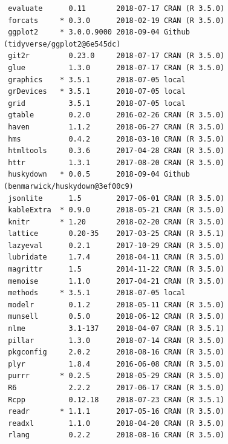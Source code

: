\documentclass[twoside,12pt,final]{ucthesis-CA2012}
\begin{document}
\begin{ucmainmatter}
\begin{verbatim}
 evaluate      0.11       2018-07-17 CRAN (R 3.5.0)                       
 forcats     * 0.3.0      2018-02-19 CRAN (R 3.5.0)                       
 ggplot2     * 3.0.0.9000 2018-09-04 Github (tidyverse/ggplot2@6e545dc)   
 git2r         0.23.0     2018-07-17 CRAN (R 3.5.0)                       
 glue          1.3.0      2018-07-17 CRAN (R 3.5.0)                       
 graphics    * 3.5.1      2018-07-05 local                                
 grDevices   * 3.5.1      2018-07-05 local                                
 grid          3.5.1      2018-07-05 local                                
 gtable        0.2.0      2016-02-26 CRAN (R 3.5.0)                       
 haven         1.1.2      2018-06-27 CRAN (R 3.5.0)                       
 hms           0.4.2      2018-03-10 CRAN (R 3.5.0)                       
 htmltools     0.3.6      2017-04-28 CRAN (R 3.5.0)                       
 httr          1.3.1      2017-08-20 CRAN (R 3.5.0)                       
 huskydown   * 0.0.5      2018-09-04 Github (benmarwick/huskydown@3ef00c9)
 jsonlite      1.5        2017-06-01 CRAN (R 3.5.0)                       
 kableExtra  * 0.9.0      2018-05-21 CRAN (R 3.5.0)                       
 knitr       * 1.20       2018-02-20 CRAN (R 3.5.0)                       
 lattice       0.20-35    2017-03-25 CRAN (R 3.5.1)                       
 lazyeval      0.2.1      2017-10-29 CRAN (R 3.5.0)                       
 lubridate     1.7.4      2018-04-11 CRAN (R 3.5.0)                       
 magrittr      1.5        2014-11-22 CRAN (R 3.5.0)                       
 memoise       1.1.0      2017-04-21 CRAN (R 3.5.0)                       
 methods     * 3.5.1      2018-07-05 local                                
 modelr        0.1.2      2018-05-11 CRAN (R 3.5.0)                       
 munsell       0.5.0      2018-06-12 CRAN (R 3.5.0)                       
 nlme          3.1-137    2018-04-07 CRAN (R 3.5.1)                       
 pillar        1.3.0      2018-07-14 CRAN (R 3.5.0)                       
 pkgconfig     2.0.2      2018-08-16 CRAN (R 3.5.0)                       
 plyr          1.8.4      2016-06-08 CRAN (R 3.5.0)                       
 purrr       * 0.2.5      2018-05-29 CRAN (R 3.5.0)                       
 R6            2.2.2      2017-06-17 CRAN (R 3.5.0)                       
 Rcpp          0.12.18    2018-07-23 CRAN (R 3.5.1)                       
 readr       * 1.1.1      2017-05-16 CRAN (R 3.5.0)                       
 readxl        1.1.0      2018-04-20 CRAN (R 3.5.0)                       
 rlang         0.2.2      2018-08-16 CRAN (R 3.5.0)                       

\end{verbatim}
\end{ucmainmatter}
\end{document}
